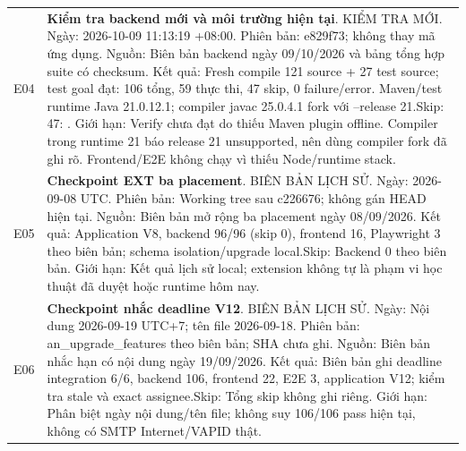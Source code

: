 \begin{longtable}{@{}P{.11\textwidth}P{.79\textwidth}@{}}
\label{ev:E04}E04 & \textbf{Kiểm tra backend mới và môi trường hiện tại}. KIỂM TRA MỚI. \newline Ngày: 2026-10-09 11:13:19 +08:00. Phiên bản: e829f73; không thay mã ứng dụng. \newline Nguồn: Biên bản backend ngày 09/10/2026 và bảng tổng hợp suite có checksum. \newline Kết quả: Fresh compile 121 source + 27 test source; test goal đạt: 106 tổng, 59 thực thi, 47 skip, 0 failure\slash error. Maven\slash test runtime Java 21.0.12.1; compiler javac 25.0.4.1 fork với --release 21.\newline Skip: 47: . \newline Giới hạn: Verify chưa đạt do thiếu Maven plugin offline. Compiler trong runtime 21 báo release 21 unsupported, nên dùng compiler fork đã ghi rõ. Frontend\slash E2E không chạy vì thiếu Node\slash runtime stack. \\
\label{ev:E05}E05 & \textbf{Checkpoint EXT ba placement}. BIÊN BẢN LỊCH SỬ. \newline Ngày: 2026-09-08 UTC. Phiên bản: Working tree sau c226676; không gán HEAD hiện tại. \newline Nguồn: Biên bản mở rộng ba placement ngày 08/09/2026. \newline Kết quả: Application V8, backend 96\slash 96 (skip 0), frontend 16, Playwright 3 theo biên bản; schema isolation\slash upgrade local.\newline Skip: Backend 0 theo biên bản. \newline Giới hạn: Kết quả lịch sử local; extension không tự là phạm vi học thuật đã duyệt hoặc runtime hôm nay. \\
\label{ev:E06}E06 & \textbf{Checkpoint nhắc deadline V12}. BIÊN BẢN LỊCH SỬ. \newline Ngày: Nội dung 2026-09-19 UTC+7; tên file 2026-09-18. Phiên bản: an\_upgrade\_features theo biên bản; SHA chưa ghi. \newline Nguồn: Biên bản nhắc hạn có nội dung ngày 19/09/2026. \newline Kết quả: Biên bản ghi deadline integration 6\slash 6, backend 106, frontend 22, E2E 3, application V12; kiểm tra stale và exact assignee.\newline Skip: Tổng skip không ghi riêng. \newline Giới hạn: Phân biệt ngày nội dung\slash tên file; không suy 106\slash 106 pass hiện tại, không có SMTP Internet\slash VAPID thật. \\

\end{longtable}
